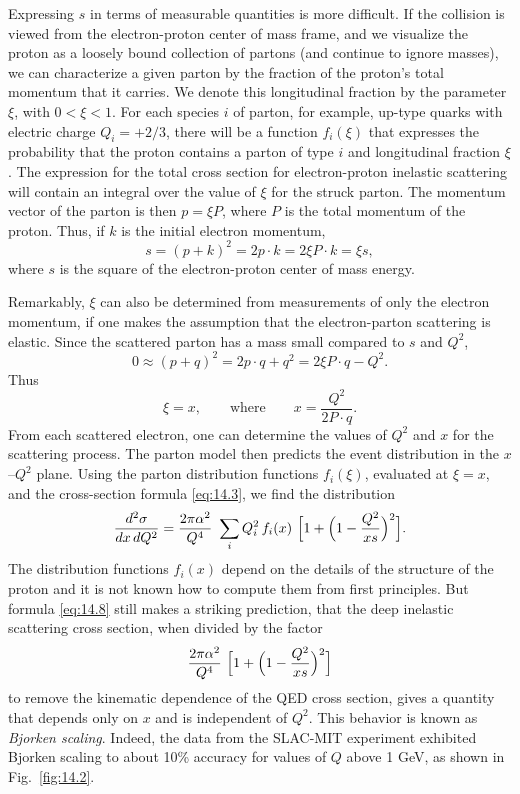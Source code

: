 Expressing $s$ in terms of measurable quantities is more difficult.  If the
collision is viewed from the electron-proton center of mass frame, and we
visualize the proton as a loosely bound collection of partons (and continue
to ignore masses), we can characterize a given parton by the fraction of the
proton's total momentum that it carries.  We denote this longitudinal
fraction by the parameter $\xi$, with $0 < \xi < 1$.  For each species $i$ of
parton, for example, up-type quarks with electric charge $Q_i = +2/3$, there
will be a function $f_i(\xi)$ that expresses the probability that the proton
contains a parton of type $i$ and longitudinal fraction $\xi$.  The
expression for the total cross section for electron-proton inelastic
scattering will contain an integral over the value of $\xi$ for the struck
parton.  The momentum vector of the parton is then $p = \xi P$, where $P$ is
the total momentum of the proton.  Thus, if $k$ is the initial electron
momentum,
\begin{equation}
  s = (p+k)^2 = 2p\cdot k = 2\xi P\cdot k = \xi s ,
  \label{eq:14.5}
\end{equation}
where $s$ is the square of the electron-proton center of mass energy.

Remarkably, $\xi$ can also be determined from measurements of only the
electron momentum, if one makes the assumption that the electron-parton
scattering is elastic.  Since the scattered parton has a mass small compared
to $s$ and $Q^2$,
\begin{equation}
  0 \approx (p+q)^2 = 2p\cdot q + q^2 = 2\xi P\cdot q - Q^2 .
  \label{eq:14.6}
\end{equation}
Thus
\begin{equation}
  \xi = x,
  \qquad\text{where}\qquad
  x = \frac{Q^2}{2P\cdot q} .
  \label{eq:14.7}
\end{equation}
From each scattered electron, one can determine the values of $Q^2$ and $x$
for the scattering process.  The parton model then predicts the event
distribution in the $x$--$Q^2$ plane.  Using the parton distribution functions
$f_i(\xi)$, evaluated at $\xi = x$, and the cross-section formula
\eqref{eq:14.3}, we find the distribution
\begin{equation}
  \frac{d^2\sigma}{dx\,dQ^2}
  = \frac{2\pi\alpha^2}{Q^4}\ \sum_i Q_i^2\,f_i(x)\ \Bigl[ 1 + \Bigl(
    1 - \frac{Q^2}{xs} \Bigr)^2 \Bigr] .
  \label{eq:14.8}
\end{equation}
The distribution functions $f_i(x)$ depend on the details of the structure of
the proton and it is not known how to compute them from first principles.
But formula \eqref{eq:14.8} still makes a striking prediction, that the deep
inelastic scattering cross section, when divided by the factor
\begin{equation}
  \frac{2\pi\alpha^2}{Q^4}\ \Bigl[ 1 + \Bigl( 1 - \frac{Q^2}{xs}
    \Bigr)^2 \Bigr]
  \label{eq:14.9}
\end{equation}
to remove the kinematic dependence of the QED cross section, gives a quantity
that depends only on $x$ and is independent of $Q^2$.  This behavior is known
as \emph{Bjorken scaling}.  Indeed, the data from the SLAC-MIT experiment
exhibited Bjorken scaling to about 10\% accuracy for values of $Q$ above
1 GeV, as shown in Fig.~\ref{fig:14.2}.

